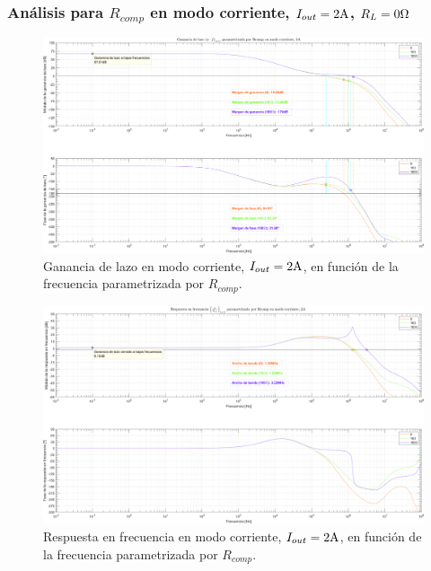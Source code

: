 \clearpage


\subsubsection{Análisis para $R_{comp}$ en modo corriente, $I_{out} = 2 \si[per-mode=symbol]{\ampere}$, $R_{L} = 0 \si[per-mode=symbol]{\ohm}$}

\clearpage

\begin{figure}[H] %
\begin{center}
\includegraphics[width=1.1 \textwidth, angle=90]{./img/plots/loop/power_supply_RCOMP_LOOP_Modo3.png}
\caption{\label{fig:fig_power_supply_RCOMP_LOOP_Modo3}\footnotesize{Ganancia de lazo en modo corriente, $I_{out} = 2 \si[per-mode=symbol]{\ampere}$, en función de la frecuencia parametrizada por $R_{comp}$.}}
\end{center}
\end{figure}


\clearpage

\begin{figure}[H] %
\begin{center}
\includegraphics[width=1.1 \textwidth, angle=90]{./img/plots/rf/power_supply_RCOMP_RF_Modo3.png}
\caption{\label{fig:fig_power_supply_RCOMP_RF_Modo3}\footnotesize{Respuesta en frecuencia en modo corriente, $I_{out} = 2 \si[per-mode=symbol]{\ampere}$, en función de la frecuencia parametrizada por $R_{comp}$.}}
\end{center}
\end{figure}

